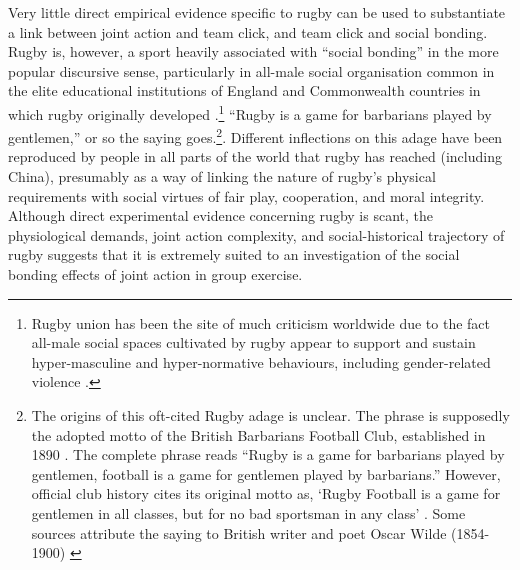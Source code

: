Very little direct empirical evidence specific to rugby can be used to substantiate a link between joint action and team click, and team click and social bonding.  Rugby is, however, a sport heavily associated with ``social bonding'' in the more popular discursive sense, particularly in all-male social organisation common in the elite educational institutions of England and Commonwealth countries in which rugby originally developed \citep{Dunning2005,Richards2007,Collins2008}.\footnote{Rugby union has been the site of much criticism worldwide due to the fact all-male social spaces cultivated by rugby appear to support and sustain hyper-masculine and hyper-normative behaviours, including gender-related violence \citep{Cosslett2014,Guinness2016}.
}   ``Rugby is a game for barbarians played by gentlemen,'' or so the saying goes.\footnote{The origins of this oft-cited Rugby adage is unclear.  The phrase is supposedly the adopted motto of the British Barbarians Football Club, established in 1890 \citep[34]{Dunning2005}.  The complete phrase reads ``Rugby is a game for barbarians played by gentlemen, football is a game for gentlemen played by barbarians.''  However, official club history cites its original motto as, ‘Rugby Football is a game for gentlemen in all classes, but for no bad sportsman in any class' \citep[vii]{Starmer-Smith1977}.  Some sources attribute the saying to British writer and poet Oscar Wilde (1854-1900) \citep{Fleenor2015}}. Different inflections on this adage have been reproduced by people in all parts of the world that rugby has reached (including China), presumably as a way of linking the nature of rugby's physical requirements with social virtues of fair play, cooperation, and moral integrity.  Although direct experimental evidence concerning rugby is scant, the physiological demands, joint action complexity, and social-historical trajectory of rugby suggests that it is extremely suited to an investigation of the social bonding effects of joint action in group exercise.

